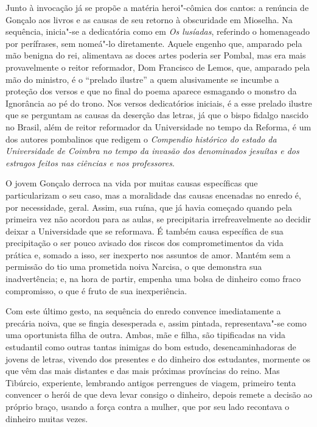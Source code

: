 Junto à invocação já se propõe a matéria heroi"-cômica dos cantos: a renúncia de
Gonçalo aos livros e as causas de seu retorno à obscuridade em Mioselha.  Na
sequência, inicia"-se a dedicatória como em \textit{Os lusíadas}, referindo o
homenageado por perífrases, sem nomeá"-lo diretamente. Aquele engenho que,
amparado pela mão benigna do rei, alimentava as doces artes poderia ser Pombal,
mas era mais provavelmente o reitor reformador, Dom Francisco de Lemos, que,
amparado pela mão do ministro, é o ``prelado ilustre'' a quem alusivamente se
incumbe a proteção dos versos e que no final do poema aparece
esmagando o monstro da Ignorância ao pé do trono. Nos versos dedicatórios
iniciais, é a esse prelado ilustre que se perguntam as causas da deserção das
letras, já que o bispo fidalgo nascido no Brasil, além de reitor reformador da
Universidade no tempo da Reforma, é um dos autores pombalinos que redigem o
\textit{Compendio histórico do estado da Universidade de Coimbra no tempo da
invasão dos denominados jesuítas e dos estragos feitos nas ciências e nos
professores}.

O jovem Gonçalo derroca na vida por muitas causas específicas que particularizam
o seu caso, mas a moralidade das causas encenadas no enredo é, por necessidade,
geral. Assim, sua ruína, que já havia começado quando pela primeira vez não
acordou para as aulas, se precipitaria irrefreavelmente ao decidir deixar a
Universidade que se reformava.  É também causa específica de sua precipitação o
ser pouco avisado dos riscos dos comprometimentos da vida prática e, somado a
isso, ser inexperto nos assuntos de amor.  Mantém sem a permissão do tio uma
prometida noiva Narcisa, o que demonstra sua inadvertência; e, na hora de
partir, empenha uma bolsa de dinheiro como fraco compromisso, o que é fruto de
sua inexperiência.

Com este último gesto, na sequência do enredo convence imediatamente a precária
noiva, que se fingia desesperada e, assim pintada, representava"-se como uma
oportunista filha de outra. Ambas, mãe e filha, são tipificadas na vida
estudantil como outras tantas inimigas do bom estudo, desencaminhadoras de
jovens de letras, vivendo dos presentes e do dinheiro dos estudantes, mormente
os que vêm das mais distantes e das mais próximas províncias do reino.  Mas		%
Tibúrcio, experiente, lembrando antigos perrengues de viagem, primeiro tenta
convencer o herói de que deva levar consigo o dinheiro, depois remete a decisão
ao próprio braço, usando a força contra a mulher, que por seu lado recontava o
dinheiro muitas vezes.

